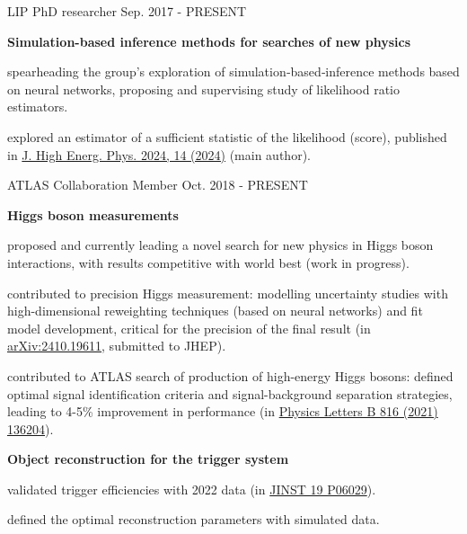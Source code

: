 

\begin{cventries}

    \cventry
    {LIP}
    {PhD researcher}
    {}
    {Sep. 2017 - PRESENT}
    {
        \textbf{Simulation-based inference methods for searches of new physics}\vspace{12pt}
        \begin{cvitems}      
            \item {spearheading the group's exploration of simulation‑based‑inference methods based on neural networks, proposing and supervising study of likelihood ratio estimators.}
            \item {explored an estimator of a sufficient statistic of the likelihood (score), published in \href{https://doi.org/10.1007/JHEP04(2024)014}{J. High Energ. Phys. 2024, 14 (2024)} (main author).}
        \end{cvitems}
    }

    \cventry
    {ATLAS Collaboration}
    {Member}
    {}
    {Oct. 2018 - PRESENT}
    {
        \textbf{Higgs boson measurements}\vspace{14pt}
        \begin{cvitems}
            \item {proposed and currently leading a novel search for new physics in Higgs boson interactions, with results competitive with world best (work in progress).}
            \item {contributed to precision Higgs measurement: modelling uncertainty studies with high-dimensional reweighting techniques (based on neural networks) and fit model development, critical for the precision of the final result (in \href{https://arxiv.org/abs/2410.19611}{arXiv:2410.19611}, submitted to JHEP).}
            \item {contributed to ATLAS search of production of high-energy Higgs bosons: defined optimal signal identification criteria and signal-background separation strategies, leading to 4-5\% improvement in performance (in \href{https://doi.org/10.1016/j.physletb.2021.136204}{Physics Letters B 816 (2021) 136204}).}
        \end{cvitems}\vspace{19pt}
        \textbf{Object reconstruction for the trigger system}\vspace{14pt}
        \begin{cvitems}
            \item {validated trigger efficiencies with 2022 data (in \href{https://doi.org/10.1088/1748-0221/19/06/P06029}{JINST 19 P06029}).}
            \item {defined the optimal reconstruction parameters with simulated data.}
        \end{cvitems}
    }


\end{cventries}
